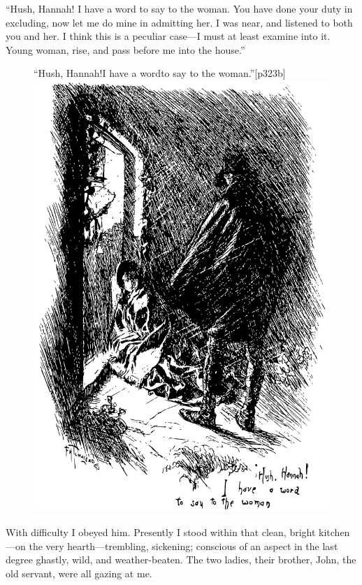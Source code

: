 \enquote{Hush, Hannah! I have a word to say to the woman. You have
done your duty in excluding, now let me do mine in admitting her. I was
near, and listened to both you and her. I think this is a peculiar
case---I must at least examine into it. Young woman, rise, and pass
before me into the house.}

\begin{figure}
	\begin{sidecaption}{\enquote{Hush, Hannah!\linebreak I have a word\linebreak to say to the woman.}}[p323b]
		\centering
		\includegraphics[width=\linewidth]{images/p323b.pdf}
	\end{sidecaption}
\end{figure}

With difficulty I obeyed him. Presently I stood within that clean,
bright kitchen---on the very hearth---trembling, sickening; conscious of
an aspect in the last degree ghastly, wild, and weather-beaten. The two
ladies, their brother, \Mr{} \St{} John, the old servant, were all gazing at
me.

